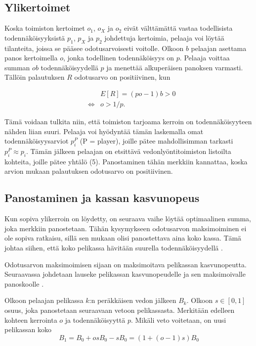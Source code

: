 \documentclass[a4paper,finnish,titlepage,12pt]{article}
\begin{document}
\subsection{Ylikertoimet}
Koska toimiston kertoimet $o_1$, $o_X$ ja $o_2$ eivät välttämättä vastaa todellisista todennäköisyyksistä $p_1$, $p_X$ ja $p_2$ johdettuja kertoimia, pelaaja voi löytää tilanteita, joissa se pääsee odotusarvoisesti voitolle. Olkoon $b$ pelaajan asettama panos kertoimella $o$, jonka todellinen todennäköisyys on $p$. Pelaaja voittaa summan $ob$ todennäköisyydellä $p$ ja menettää alkuperäisen panoksen varmasti. Tällöin palautuksen $R$ odotusarvo on positiivinen, kun

\begin{eqnarray}
	&& E[R] = (p o - 1) b > 0 \\
	&\Leftrightarrow& o > 1 / p.
\end{eqnarray}

Tämä voidaan tulkita niin, että toimiston tarjoama kerroin on todennäköisyyteen nähden liian suuri. Pelaaja voi hyödyntää tämän laskemalla omat todennäköisyysarviot $p_{i}^{P}$ (P = player), joille pätee mahdollisimman tarkasti $p_{i}^{P} \approx p_i$. Tämän jälkeen pelaajan on etsittävä vedonlyöntitoimiston listoilta kohteita, joille pätee yhtälö (5). Panostaminen tähän merkkiin kannattaa, koska arvion mukaan palautuksen odotusarvo on positiivinen.

\subsection{Panostaminen ja kassan kasvunopeus}
Kun sopiva ylikerroin on löydetty, on seuraava vaihe löytää optimaalinen summa, joka merkkiin panostetaan. Tähän kysymykseen odotusarvon maksimoiminen ei ole sopiva ratkaisu, sillä sen mukaan olisi panostettava aina koko kassa. Tämä johtaa siihen, että koko pelikassa hävitään suurella todennäköisyydellä \cite{growth}.

Odotusarvon maksimoimisen sijaan on maksimoitava pelikassan kasvunopeutta. Seuraavassa johdetaan lauseke pelikassan kasvunopeudelle ja sen maksimoivalle panoskoolle \cite{kelly}.

Olkoon pelaajan pelikassa $k$:n peräkkäisen vedon jälkeen $B_k$.  Olkoon $s \in [0,1]$ osuus, joka panostetaan seuraavaan vetoon pelikassasta. Merkitään edelleen kohteen kerrointa $o$ ja todennäköisyyttä $p$. Mikäli veto voitetaan, on uusi pelikassan koko
\begin{equation}
	B_{1} = B_0 + osB_0 - sB_0 = (1 + (o-1)s) B_0
\end{equation}
\end{document}

